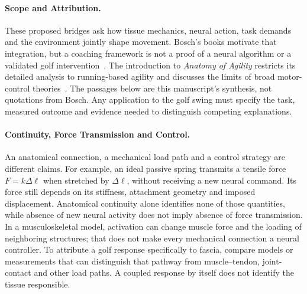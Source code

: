 
\paragraph{Scope and Attribution.}
These proposed bridges ask how tissue mechanics, neural action, task demands and the environment jointly shape movement.
Bosch's books motivate that integration, but a coaching framework is not a proof of a neural algorithm or a validated golf intervention~\cite{Bosch2015,Bosch2020}.
The introduction to \emph{Anatomy of Agility} restricts its detailed analysis to running-based agility and discusses the limits of broad motor-control theories~\cite{Bosch2020}.
The passages below are this manuscript's synthesis, not quotations from Bosch.
Any application to the golf swing must specify the task, measured outcome and evidence needed to distinguish competing explanations.


\paragraph{Continuity, Force Transmission and Control.}
An anatomical connection, a mechanical load path and a control strategy are different claims.
For example, an ideal passive spring transmits a tensile force $F=k\Delta\ell$ when stretched by $\Delta\ell$, without receiving a new neural command.
Its force still depends on its stiffness, attachment geometry and imposed displacement.
Anatomical continuity alone identifies none of those quantities, while absence of new neural activity does not imply absence of force transmission.
In a musculoskeletal model, activation can change muscle force and the loading of neighboring structures; that does not make every mechanical connection a neural controller.
To attribute a golf response specifically to fascia, compare models or measurements that can distinguish that pathway from muscle--tendon, joint-contact and other load paths.
A coupled response by itself does not identify the tissue responsible.

